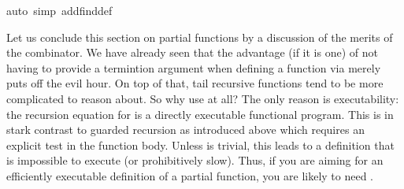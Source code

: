 \begin{isabellebody}
auto\ simp\ add{\isacharcolon}find{}{\isacharunderscore}def{\isacharparenright}\isanewline
{}%
\begin{isamarkuptext}%
Let us conclude this section on partial functions by a
discussion of the merits of the  combinator. We have
already seen that the advantage (if it is one) of not having to
provide a termintion argument when defining a function via  merely puts off the evil hour. On top of that, tail recursive
functions tend to be more complicated to reason about. So why use
 at all? The only reason is executability: the recursion
equation for  is a directly executable functional
program. This is in stark contrast to guarded recursion as introduced
above which requires an explicit test  in the
function body.  Unless  is trivial, this leads to a
definition that is impossible to execute (or prohibitively slow).
Thus, if you are aiming for an efficiently executable definition
of a partial function, you are likely to need .%
\end{isamarkuptext}%
\end{isabellebody}%
